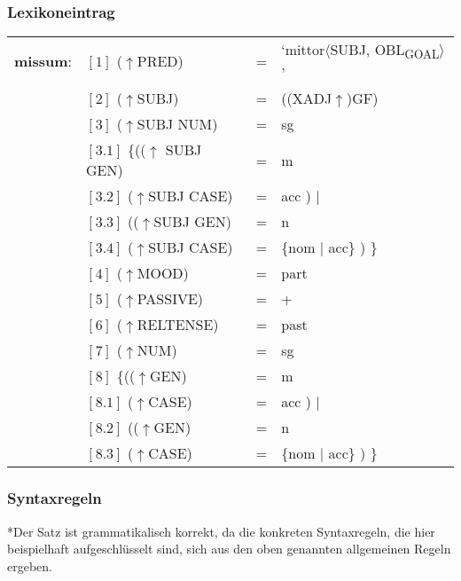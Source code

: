 \documentclass[12pt,a4paper]{article}
\begin{document}
\subsubsection{Lexikoneintrag}
\begin{singlespace}
\begin{tabular}{ l  l  l  l  } 
\textbf{missum}: & $[1]$ \:  ($\uparrow$PRED) & = & `mittor$\langle$SUBJ, OBL\textsubscript{GOAL}$\rangle$'\\
$\qquad$ & $[2]$ \:  ($\uparrow$SUBJ) & = & ((XADJ$\uparrow$)GF)\\
$\qquad$ & $[3]$ \:  ($\uparrow$SUBJ NUM) & = & sg \\
$\qquad$ & $[3.1]$ \:  \{(($\uparrow$ SUBJ GEN) & = & m \\ 
$\qquad$ & $[3.2]$ \:  ($\uparrow$SUBJ CASE) & = & acc ) $\mid$\\
$\qquad$ & $[3.3]$ \: (($\uparrow$SUBJ GEN) & = & n \\
$\qquad$ & $[3.4]$ \:  ($\uparrow$SUBJ CASE) & = & \{nom $\mid$ acc\} ) \}\\
$\qquad$ & $[4]$ \:  ($\uparrow$MOOD) & = & part\\
$\qquad$ & $[5]$ \:  ($\uparrow$PASSIVE) & = & + \\
$\qquad$ & $[6]$ \:  ($\uparrow$RELTENSE) & = & past \\
$\qquad$ & $[7]$ \:  ($\uparrow$NUM) & = & sg \\
$\qquad$ & $[8]$ \:  \{(($\uparrow$GEN) & = & m \\ 
$\qquad$ & $[8.1]$ \:  ($\uparrow$CASE) & = & acc ) $\mid$\\
$\qquad$ & $[8.2]$ \: (($\uparrow$GEN) & = & n \\
$\qquad$ & $[8.3]$ \:  ($\uparrow$CASE) & = & \{nom $\mid$ acc\} ) \}\\
\end{tabular}
\newline
\newline
\end{singlespace}


\subsubsection{Syntaxregeln}
*Der Satz ist grammatikalisch korrekt, da die konkreten Syntaxregeln, die hier beispielhaft aufgeschlüsselt sind, sich aus den oben genannten allgemeinen Regeln ergeben.
\end{document}
